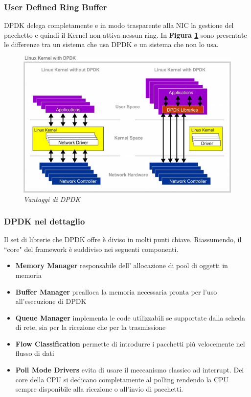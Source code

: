 \subsubsection*{User Defined Ring Buffer}
DPDK delega completamente e in modo trasparente alla NIC la gestione del pacchetto e quindi il Kernel non attiva nessun ring.
\leavevmode\newline
In \textbf{Figura \ref{fig:dpdkdifferences}} sono presentate le differenze tra un sistema che usa DPDK e un sistema che non lo usa.
\FloatBarrier
\vspace{1cm}
\begin{figure}[h]
\includegraphics[scale=0.30]{images/dpdkdifferences.png}
\centering
\caption{\textit{Vantaggi di DPDK}}
\label{fig:dpdkdifferences}
\end{figure}
\FloatBarrier

\subsubsection*{DPDK nel dettaglio}
Il set di librerie che DPDK offre è diviso in molti punti chiave. Riassumendo, il ``core" del framework è suddiviso nei seguenti componenti.
\begin{itemize}
    \item \textbf{Memory Manager} responsabile dell' allocazione di pool di oggetti in memoria
    \item \textbf{Buffer Manager} prealloca la memoria necessaria pronta per l'uso all'esecuzione di DPDK
    \item \textbf{Queue Manager} implementa le code utilizzabili se supportate dalla scheda di rete, sia per la ricezione che per la trasmissione
    \item \textbf{Flow Classification} permette di introdurre i pacchetti più velocemente nel flusso di dati
    \item \textbf{Poll Mode Drivers} evita di usare il meccanismo classico ad interrupt. Dei core della CPU si dedicano completamente al polling rendendo la CPU sempre disponibile alla ricezione o all'invio di pacchetti.
\end{itemize}

